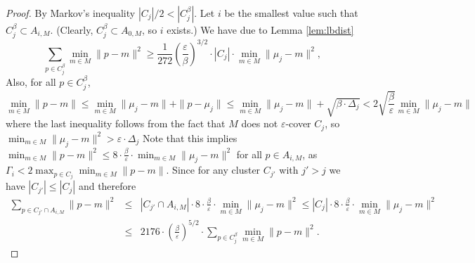 \documentclass[10pt,a4paper]{amsart}
\begin{document}
\begin{proof}
By Markov's inequality $|C_j|/2 < |C_j^\beta|$.
Let $i$ be the smallest value such that $C_j^{\beta} \subset A_{i,M}$. (Clearly, $C_j^{\beta} \subset A_{0,M}$, so $i$ exists.)
We have due to Lemma \ref{lem:lbdist}
$$\sum_{p\in C_j^\beta} \min_{m\in M}\|p-m\|^2 \geq \frac{1}{272}\left(\frac{\varepsilon}{\beta}\right)^{3/2}\cdot |C_j| \cdot \min_{m\in M}\|\mu_j-m\|^2,$$
Also, for all $p\in C_j^\beta$,
$$ \min_{m\in M}\|p-m\| \leq \min_{m\in M}\|\mu_j-m\| + \|p-\mu_j\| \leq \min_{m\in M}\|\mu_j-m\| + \sqrt{\beta \cdot \Delta_j} < 2\sqrt{\frac{\beta}{\varepsilon}} \min_{m\in M}\|\mu_j-m\|$$
where the last inequality follows from the fact that $M$ does not $\varepsilon$-cover $C_j$, so 
$\min_{m\in M}\|\mu_j-m\|^2 > \varepsilon\cdot \Delta_j$
Note that this implies $\min_{m\in M}\|p - m\|^2 \leq 8\cdot \frac{\beta}{\varepsilon} \cdot \min_{m\in M}\|\mu_j-m\|^2$ for all $p\in A_{i,M}$, as $\Gamma_i < 2\max_{p\in C_j}\min_{m\in M}\|p-m\|$.
Since for any cluster $C_{j'}$ with $j'>j$ we have $|C_{j'}|\leq |C_j|$ and therefore 
\begin{eqnarray}
  \sum_{p\in C_{j'}\cap A_{i,M}} \|p-m\|^2 
&\leq& |C_{j'}\cap A_{i,M}| \cdot 8\cdot \frac{\beta}{\varepsilon} \cdot 
   \min_{m\in M}\|\mu_j-m\|^2\leq |C_j| \cdot 8\cdot \frac{\beta}{\varepsilon} \cdot \min_{m\in M}\|\mu_j-m\|^2\nonumber \\
&\leq& 2176\cdot \left(\frac{\beta}{\varepsilon}\right)^{5/2} \cdot \sum_{p\in C_j^\beta}\min_{m\in M}\|p-m\|^2.
\label{eq: smaller clusters}
\end{eqnarray}


\end{proof}
\end{document}
